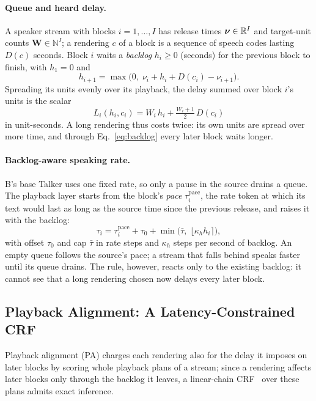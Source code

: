 \paragraph{Queue and heard delay.} A speaker stream with blocks $i=1,\dots,I$ has release times $\bm{\nu}\in\mathbb{R}^{I}$ and
target-unit counts $\bm{W}\in\mathbb{N}^{I}$; a rendering $c$ of a block is a sequence of speech codes lasting $D(c)$
seconds. Block $i$ waits a \emph{backlog} $h_i\ge0$ (seconds) for the previous block to finish, with $h_1=0$ and
\begin{equation}
h_{i+1}=\max\big(0,\;\nu_i+h_i+D(c_i)-\nu_{i+1}\big).
\label{eq:backlog}
\end{equation}
Spreading its units evenly over its playback, the delay summed over block $i$'s units is the scalar
\begin{equation}
L_i(h_i,c_i)=W_i\,h_i+\tfrac{W_i+1}{2}\,D(c_i)
\label{eq:lat}
\end{equation}
in unit-seconds. A long rendering thus costs twice: its own units are spread over more time, and through
Eq.~\eqref{eq:backlog} every later block waits longer.

\paragraph{Backlog-aware speaking rate.} B's base Talker uses one fixed rate, so only a pause in the source drains a
queue. The playback layer starts from the block's
\emph{pace} $\tau^{\mathrm{pace}}_i$, the rate token at which its text would last as long as the source time since the
previous release, and raises it with the backlog:
\begin{equation}
\tau_i=\tau^{\mathrm{pace}}_i+\tau_0+\min\big(\bar\tau,\;\lfloor\kappa_h h_i\rceil\big),
\label{eq:rate}
\end{equation}
with offset $\tau_0$ and cap $\bar\tau$ in rate steps and $\kappa_h$ steps per second of backlog. An empty queue follows
the source's pace; a stream that falls behind speaks faster until its queue drains. The rule, however, reacts only to
the existing backlog: it cannot see that a long rendering chosen now delays every later block.

\subsection{Playback Alignment: A Latency-Constrained CRF}
\label{sec:method-plem}

Playback alignment (PA) charges each rendering also for the delay it imposes on later blocks by scoring whole playback
plans of a stream; since a rendering affects later blocks only through the backlog it leaves, a linear-chain
CRF~\citep{lafferty2001crf} over these plans admits exact inference.

